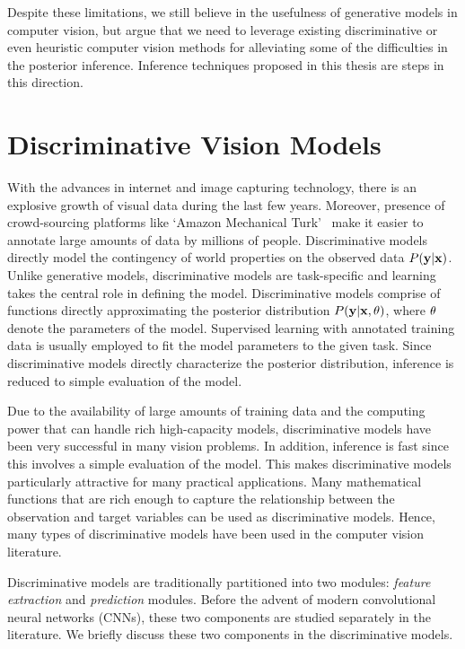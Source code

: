 Despite these limitations, we still believe in the usefulness of generative
models in computer vision, but argue that we need to leverage existing discriminative
or even heuristic computer vision methods for alleviating some of the difficulties in the
posterior inference. Inference techniques proposed in this thesis are steps
in this direction.

\section{Discriminative Vision Models}

With the advances in internet and image capturing technology, there is an explosive
growth of visual data during the last few years. Moreover, presence of crowd-sourcing
platforms like `Amazon Mechanical Turk'~\cite{mturk} make it easier to annotate large
amounts of data by millions of people. Discriminative models directly model the
contingency of world properties on the observed data $P(\mathbf{y}|\mathbf{x})$.
Unlike generative models, discriminative
models are task-specific and learning takes the central role in defining the model.
Discriminative models comprise of functions directly approximating
the posterior distribution $P(\mathbf{y}|\mathbf{x}, \mathbf{\theta})$, where $\mathbf{\theta}$ denote
the parameters of the model. Supervised learning with annotated training data
is usually employed to fit the model parameters to the given task.
Since discriminative models directly characterize
the posterior distribution, inference is reduced to simple evaluation of
the model.

Due to the availability of large amounts of training data and the computing power
that can handle rich high-capacity models, discriminative models have been very
successful in many vision problems. In addition, inference is fast
since this involves a simple evaluation of the model. This makes discriminative
models particularly attractive for many practical applications. Many
mathematical functions that are rich enough to capture the relationship between
the observation and target variables can be used as discriminative models.
Hence, many types of discriminative models have been used in the computer vision
literature.

Discriminative models are traditionally partitioned into two modules:
\textit{feature extraction} and \textit{prediction} modules.
Before the advent of modern convolutional neural networks (CNNs),
these two components are studied separately in the literature.
We briefly discuss these two components in the discriminative models.


